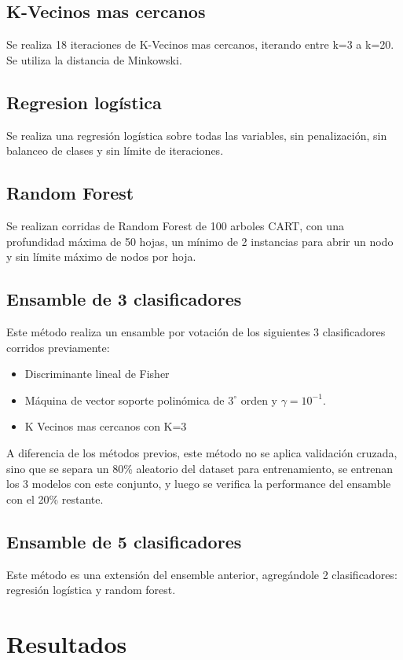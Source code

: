 \documentclass[journal]{IEEEtran}
\begin{document}
\subsection{K-Vecinos mas cercanos}
Se realiza 18 iteraciones de K-Vecinos mas cercanos, iterando entre k=3
a k=20. Se utiliza la distancia de Minkowski.

\subsection{Regresion logística}
Se realiza una regresión logística sobre todas las variables, sin penalización,
sin balanceo de clases y sin límite de iteraciones.

\subsection{Random Forest}
Se realizan corridas de Random Forest de 100 arboles CART, con una 
profundidad máxima de 50 hojas, un mínimo de 2 instancias para abrir
un nodo y sin límite máximo de nodos por hoja.

\subsection{Ensamble de 3 clasificadores}
Este método realiza un ensamble por votación de los siguientes 3
clasificadores corridos previamente:

\begin{itemize}
\item Discriminante lineal de Fisher
\item Máquina de vector soporte polinómica de $3^{\circ}$ orden y $\gamma=10^{-1}$. 
\item K Vecinos mas cercanos con K=3
\end{itemize}

A diferencia de los métodos previos, este método no se aplica
validación cruzada, sino que se separa un 80\% aleatorio del dataset para 
entrenamiento, se entrenan los 3 modelos con este conjunto, y luego
se verifica la performance del ensamble con el 20\% restante.

\subsection{Ensamble de 5 clasificadores}
Este método es una extensión del ensemble anterior, agregándole
2 clasificadores: regresión logística y random forest.

\section{Resultados}
\end{document}
